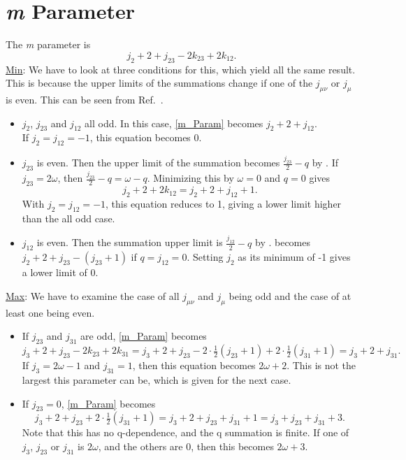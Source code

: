 \documentclass[Dissertation.tex]{subfiles}
\begin{document}
\section{\emph{m} Parameter}
The \emph{m} parameter is
\begin{equation}
	\label{m_Param}
	j_2 + 2 + j_{23} - 2 k_{23} + 2 k_{12}.
\end{equation}
\underline{Min}: 
We have to look at three conditions for this, which yield all the same result.
This is because the upper limits of the summations change if one of the
$j_{\mu \nu}$ or $j_{\mu}$ is even. This can be seen from Ref.~\cite{Perkins1969}.
\begin{itemize}
	\item $j_2$, $j_{23}$ and $j_{12}$ all odd. In this case, \cref{m_Param} becomes $j_2 + 2 + j_{12}.$ \\ If $j_2 = j_{12} = -1$, this equation becomes 0.
	\item $j_{23}$ is even. Then the upper limit of the summation becomes $\frac{j_{23}}{2}-q$ by \cite{Perkins1969}. If $j_{23} = 2 \omega$, then $\frac{j_{23}}{2}-q = \omega - q$.  Minimizing this by $\omega = 0$ and $q = 0$ gives
\begin{equation}
	j_2 + 2 + 2 k_{12} = j_2 + 2 + j_{12} + 1.
\end{equation}
	With $j_2 = j_{12} = -1$, this equation reduces to 1, giving a lower limit higher than the all odd case.
	\item $j_{12}$ is even. Then the summation upper limit is $\frac{j_{12}}{2}-q$ by \cite{Perkins1969}.  becomes $j_2 + 2 + j_{23} - (j_{23}+1)$ if $q = j_{12} = 0$.  Setting $j_2$ as its minimum of -1 gives a lower limit of 0.
\end{itemize}
\underline{Max}: We have to examine the case of all $j_{\mu \nu}$ and
   $j_{\mu}$ being odd and the case of at least one being even.
\begin{itemize}
  \item If $j_{23}$ and $j_{31}$ are odd, \cref{m_Param} becomes
  \begin{equation}
    j_3 + 2 + j_{23} - 2 k_{23} + 2 k_{31} = j_3 + 2 + j_{23} - 2\cdot\tfrac{1}{2} (j_{23} + 1) + 2\cdot\tfrac{1}{2} (j_{31} + 1) = j_{3} + 2 + j_{31}.
  \end{equation}
If $j_3 = 2\omega - 1$ and $j_{31} = 1$, then this equation becomes $2\omega + 2$.  This is not the largest this parameter can be, which is given for the next case.
  \item If $j_{23} = 0$, \cref{m_Param} becomes
	\begin{equation}
	j_3 + 2 + j_{23} + 2\cdot\tfrac{1}{2}(j_{31}+1) = j_3 + 2 + j_{23} + j_{31} + 1 = j_3 + j_{23} + j_{31} + 3.
	\end{equation}
  Note that this has no q-dependence, and the q summation is finite.  If one of $j_3$, $j_{23}$ or $j_{31}$ is $2\omega$, and the others are 0, then this becomes $2\omega + 3$.
\end{itemize}
\end{document}
